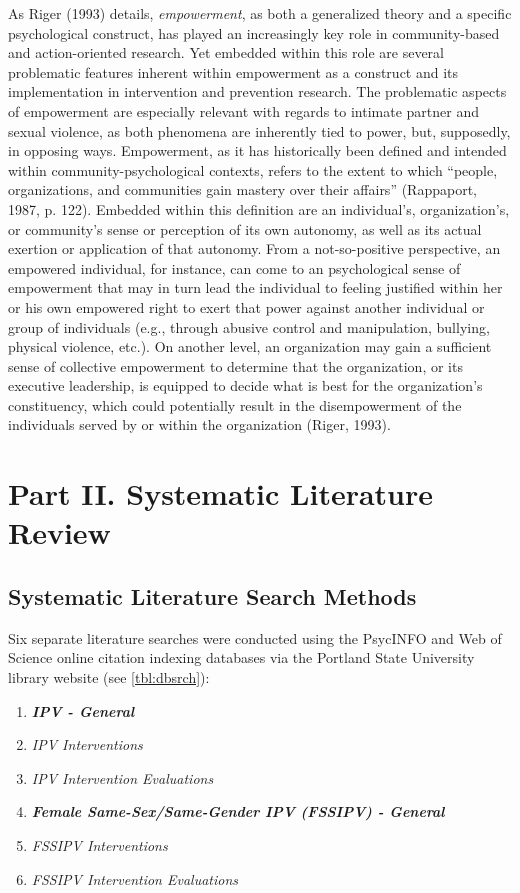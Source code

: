\documentclass[11pt,]{tufte-book}
\providecommand{\tightlist}{%
  \setlength{\itemsep}{0pt}\setlength{\parskip}{0pt}}
\begin{document}
As Riger (1993) details, \emph{empowerment}, as both a generalized
theory and a specific psychological construct, has played an
increasingly key role in community-based and action-oriented research.
Yet embedded within this role are several problematic features inherent
within empowerment as a construct and its implementation in intervention
and prevention research. The problematic aspects of empowerment are
especially relevant with regards to intimate partner and sexual
violence, as both phenomena are inherently tied to power, but,
supposedly, in opposing ways. Empowerment, as it has historically been
defined and intended within community-psychological contexts, refers to
the extent to which ``people, organizations, and communities gain
mastery over their affairs'' (Rappaport, 1987, p. 122). Embedded within
this definition are an individual's, organization's, or community's
sense or perception of its own autonomy, as well as its actual exertion
or application of that autonomy. From a not-so-positive perspective, an
empowered individual, for instance, can come to an psychological sense
of empowerment that may in turn lead the individual to feeling justified
within her or his own empowered right to exert that power against
another individual or group of individuals (e.g., through abusive
control and manipulation, bullying, physical violence, etc.). On another
level, an organization may gain a sufficient sense of collective
empowerment to determine that the organization, or its executive
leadership, is equipped to decide what is best for the organization's
constituency, which could potentially result in the disempowerment of
the individuals served by or within the organization (Riger, 1993).

\part{Part II. Systematic Literature Review}

\chapter{Systematic Literature Search
Methods}\label{systematic-literature-search-methods}

Six separate literature searches were conducted using the PsycINFO and
Web of Science online citation indexing databases via the Portland State
University library website (see \cref{tbl:dbsrch}):

\begin{enumerate}
\def\labelenumi{\arabic{enumi}.}
\tightlist
\item
  \emph{\textbf{IPV - General}}
\item
  \emph{IPV Interventions}
\item
  \emph{IPV Intervention Evaluations}
\item
  \emph{\textbf{Female Same-Sex/Same-Gender IPV (FSSIPV) - General}}
\item
  \emph{FSSIPV Interventions}
\item
  \emph{FSSIPV Intervention Evaluations}
\end{enumerate}
\end{document}
